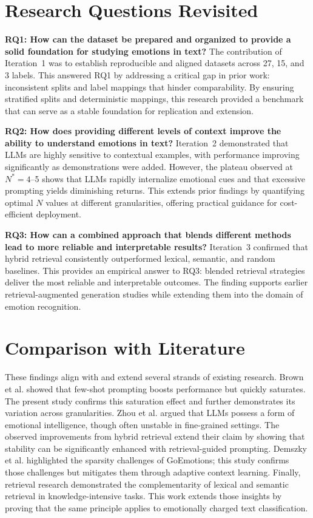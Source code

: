 \section{Research Questions Revisited}
\textbf{RQ1: How can the dataset be prepared and organized to provide a solid foundation for studying emotions in text?}  
The contribution of Iteration~1 was to establish reproducible and aligned datasets across 27, 15, and 3 labels. This answered RQ1 by addressing a critical gap in prior work: inconsistent splits and label mappings that hinder comparability. By ensuring stratified splits and deterministic mappings, this research provided a benchmark that can serve as a stable foundation for replication and extension.

\textbf{RQ2: How does providing different levels of context improve the ability to understand emotions in text?}  
Iteration~2 demonstrated that LLMs are highly sensitive to contextual examples, with performance improving significantly as demonstrations were added. However, the plateau observed at $N^{\ast}=4$--5 shows that LLMs rapidly internalize emotional cues and that excessive prompting yields diminishing returns. This extends prior findings \cite{brown2020gpt3, openai2023gpt4} by quantifying optimal $N$ values at different granularities, offering practical guidance for cost-efficient deployment.

\textbf{RQ3: How can a combined approach that blends different methods lead to more reliable and interpretable results?}  
Iteration~3 confirmed that hybrid retrieval consistently outperformed lexical, semantic, and random baselines. This provides an empirical answer to RQ3: blended retrieval strategies deliver the most reliable and interpretable outcomes. The finding supports earlier retrieval-augmented generation studies \cite{lewis2020retrieval, karpukhin2020dense} while extending them into the domain of emotion recognition.

\section{Comparison with Literature}
These findings align with and extend several strands of existing research. Brown et al. \cite{brown2020gpt3} showed that few-shot prompting boosts performance but quickly saturates. The present study confirms this saturation effect and further demonstrates its variation across granularities. Zhou et al. \cite{zhou2023emotional} argued that LLMs possess a form of emotional intelligence, though often unstable in fine-grained settings. The observed improvements from hybrid retrieval extend their claim by showing that stability can be significantly enhanced with retrieval-guided prompting. Demszky et al. \cite{demszky2020goemotions} highlighted the sparsity challenges of GoEmotions; this study confirms those challenges but mitigates them through adaptive context learning. Finally, retrieval research \cite{lewis2020retrieval, karpukhin2020dense} demonstrated the complementarity of lexical and semantic retrieval in knowledge-intensive tasks. This work extends those insights by proving that the same principle applies to emotionally charged text classification.

